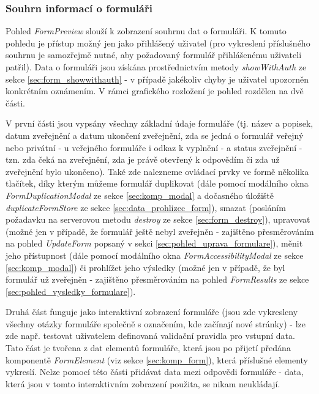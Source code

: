 		\subsubsection{Souhrn informací o formuláři}\label{sec:pohled_souhrn_formulare} %
		Pohled \textit{FormPreview} slouží k zobrazení souhrnu dat o formuláři. K tomuto pohledu je přístup možný jen jako přihlášený uživatel (pro vykreslení příslušného souhrnu je samozřejmě nutné, aby požadovaný formulář přihlášenému uživateli patřil). Data o formuláři jsou získána prostřednictvím metody \textit{showWithAuth} ze sekce  \ref{sec:form_showwithauth} - v případě jakékoliv chyby je uživatel upozorněn konkrétním oznámením. V rámci grafického rozložení je pohled rozdělen na dvě části. 
		
		V první části jsou vypsány všechny základní údaje formuláře (tj. název a popisek, datum zveřejnění a datum ukončení zveřejnění, zda se jedná o formulář veřejný nebo privátní - u veřejného formuláře i odkaz k vyplnění - a status zveřejnění - tzn. zda čeká na zveřejnění, zda je právě otevřený k odpovědím či zda už zveřejnění bylo ukončeno). Také zde nalezneme ovládací prvky ve formě několika tlačítek, díky kterým můžeme formulář duplikovat (dále pomocí modálního okna \textit{FormDuplicationModal} ze sekce \ref{sec:komp_modal} a dočasného úložiště \textit{duplicateFormStore} ze sekce \ref{sec:data_prohlizec_form}), smazat (posláním požadavku na serverovou metodu \textit{destroy} ze sekce \ref{sec:form_destroy}), upravovat (možné jen v případě, že formulář ještě nebyl zveřejněn - zajištěno přesměrováním na pohled \textit{UpdateForm} popsaný v sekci \ref{sec:pohled_uprava_formulare}), měnit jeho přístupnost (dále pomocí modálního okna \textit{FormAccessibilityModal} ze sekce \ref{sec:komp_modal}) či prohlížet jeho výsledky (možné jen v případě, že byl formulář už zveřejněn - zajištěno přesměrováním na pohled \textit{FormResults} ze sekce \ref{sec:pohled_vysledky_formulare}).
		
		Druhá část funguje jako interaktivní zobrazení formuláře (jsou zde vykresleny všechny otázky formuláře společně s označením, kde začínají nové stránky) - lze zde např. testovat uživatelem definovaná validační pravidla pro vstupní data. Tato část je tvořena z dat elementů formuláře, která jsou po přijetí předána komponentě \textit{FormElement} (viz sekce \ref{sec:komp_form}), která příslušné elementy vykreslí. Nelze pomocí této části přidávat data mezi odpovědi formuláře - data, která jsou v tomto interaktivním zobrazení použita, se nikam neukládají.
		
